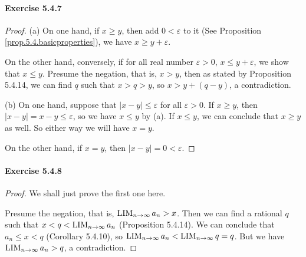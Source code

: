 \paragraph{Exercise 5.4.7} \label{exercise5.4.7}
\begin{proof}
(a)
On one hand, if $x\geq y$, then add $0<\varepsilon$ to it (See Proposition \ref{prop.5.4.basicproperties}), we have 
$x \geq y+\varepsilon$.

On the other hand, conversely, if for all real number $\varepsilon>0$, $x \leq y+\varepsilon$, we show that $x\leq y$. 
Presume the negation, that is, $x>y$, then as stated by Proposition 5.4.14, we can find $q$ such that $x>q>y$, so 
$x>y+(q-y)$, a contradiction.

(b)
On one hand, suppose that $|x-y|\leq \varepsilon$ for all $\varepsilon>0$. If $x\geq y$, then 
$|x-y|=x-y \leq \varepsilon$, so we have $x\leq y$ by (a). If $x\leq y$, we can conclude that $x\geq y$ as well. So 
either way we will have $x=y$.

On the other hand, if $x=y$, then $|x-y|=0<\varepsilon$.
\end{proof}

\paragraph{Exercise 5.4.8} \label{exercise5.4.8}
\begin{proof}
We shall just prove the first one here.

Presume the negation, that is, $\operatorname*{LIM}_{n \to \infty}{a_n}>x$. Then we can find a rational $q$ such that $x<q<\operatorname*{LIM}_{n \to \infty}{a_n}$
(Proposition 5.4.14).
We can conclude that 
$a_n\leq x<q$ (Corollary 5.4.10),
so $\operatorname*{LIM}_{n \to \infty}{a_n}<\operatorname*{LIM}_{n \to \infty}{q}=q$. But we have $\operatorname*{LIM}_{n \to \infty}{a_n}>q$, a contradiction.
\end{proof}